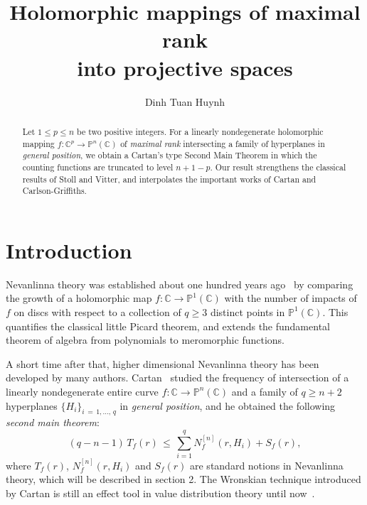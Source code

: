 \documentclass[english, 12pt]{amsart}
\theoremstyle{plain}
\theoremstyle{remark}
\numberwithin{equation}{section}
\theoremstyle{plain}
\theoremstyle{named}
\begin{document}
 
\title[Holomorphic mappings of maximal rank into projective spaces]{\bf Holomorphic mappings of maximal rank\\
into projective spaces} 




\author{Dinh Tuan Huynh}

\address{Department of Mathematics, University of Education, Hue University, 34 Le Loi St., Hue City, Vietnam}




\begin{abstract} Let $1\leq p\leq n$ be two positive integers.
For a linearly nondegenerate holomorphic mapping $f\colon\mathbb{C}^p\rightarrow\mathbb{P}^n(\mathbb{C})$ of {\sl maximal rank} intersecting a family of hyperplanes in {\sl general position}, we obtain a Cartan's type Second Main Theorem in which the counting functions are truncated to level $n+1-p$. Our result strengthens the classical results of Stoll and Vitter, and interpolates the important works of Cartan and Carlson-Griffiths.
	\end{abstract}


\maketitle
\section{Introduction}
Nevanlinna theory was established about one hundred years ago~\cite{Nevanlinna1925} by comparing the growth of a holomorphic map $f:\mathbb{C}\rightarrow\mathbb{P}^1(\mathbb{C})$ with  the number of impacts of $f$ on discs with respect to a collection of $q\geq3$ distinct points in $\mathbb{P}^1(\mathbb{C})$. This quantifies the classical little Picard theorem, and extends the fundamental theorem of algebra from polynomials to meromorphic functions.
	
A short time after that, higher dimensional Nevanlinna theory has been developed by many authors. Cartan~\cite{Cartan1933} studied the frequency of intersection of a linearly nondegenerate entire curve
	$f\colon\mathbb{C}\rightarrow\mathbb{P}^n(\mathbb{C})$
	and a family of $q\geq n+2$ hyperplanes $\{H_i\}_{i\,=\,1,\dots,\, q}$ in {\sl general position}, and he obtained the following {\sl second main theorem}:
	\begin{equation}
	\label{Cartan SMT}
	(q-n-1)
	\,
	T_f(r)
	\,
	\leq
	\,
	\sum_{i=1}^q N_f^{[n]}(r,H_i)+S_f(r),
	\end{equation}
	where $T_f(r)$, $N_f^{[n]}(r,H_i)$ and $S_f(r)$ are standard notions in Nevanlinna theory, which will be described in section 2. The Wronskian technique introduced by Cartan is still an effect tool in value distribution theory until now~\cite{Ru2009,Ru2018,HX2022}. 
	
\end{document}
